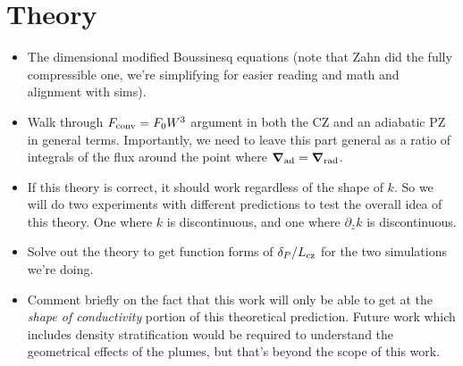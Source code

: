 \documentclass[12pt, fullpage]{article}
\renewcommand{\vec}[1]{\boldsymbol{#1}}
\newcommand{\grad}{\vec{\nabla}}
\begin{document}
\section{Theory}
\begin{itemize}
\item The dimensional modified Boussinesq equations (note that Zahn did the fully compressible one, we're simplifying for easier reading and math and alignment with sims).
\item Walk through $F_{\rm{conv}} = F_0 W^3$ argument in both the CZ and an adiabatic PZ in general terms.
Importantly, we need to leave this part general as a ratio of integrals of the flux around the point where $\grad_{\rm{ad}} = \grad_{\rm{rad}}$.
\item If this theory is correct, it should work regardless of the shape of $k$. 
So we will do two experiments with different predictions to test the overall idea of this theory.
One where $k$ is discontinuous, and one where $\partial_z k$ is discontinuous.
\item Solve out the theory to get function forms of $\delta_P/L_{\rm{cz}}$ for the two simulations we're doing.
\item Comment briefly on the fact that this work will only be able to get at the \emph{shape of conductivity} portion of this theoretical prediction.
Future work which includes density stratification would be required to understand the geometrical effects of the plumes, but that's beyond the scope of this work.
\end{itemize}
\end{document}
